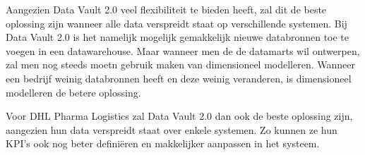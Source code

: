 Aangezien Data Vault 2.0 veel flexibiliteit te bieden heeft, zal dit de beste oplossing zijn wanneer alle data verspreidt staat op verschillende systemen. Bij Data Vault 2.0 is het namelijk mogelijk gemakkelijk nieuwe databronnen toe te voegen in een datawarehouse. Maar wanneer men de de datamarts wil ontwerpen, zal men nog steeds moetn gebruik maken van dimensioneel modelleren. Wanneer een bedrijf weinig databronnen heeft en deze weinig veranderen, is dimensioneel modelleren de betere oplossing. 

Voor DHL Pharma Logistics zal Data Vault 2.0 dan ook de beste oplossing zijn, aangezien hun data verspreidt staat over enkele systemen. Zo kunnen ze hun KPI's ook nog beter definiëren en makkelijker aanpassen in het systeem. 

